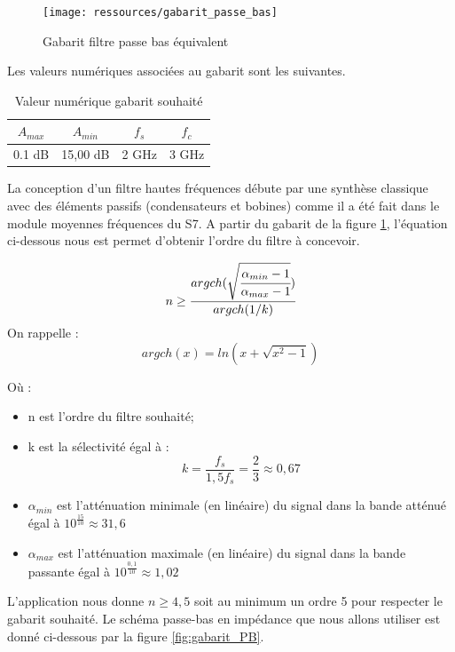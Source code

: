 \documentclass[french]{article}
\begin{document}
\begin{figure}[H]
	\centering
	\texttt{[image: ressources/gabarit\_passe\_bas]}
	\caption{Gabarit filtre passe bas équivalent}
	\label{fig:gabarit_PasseBas}
\end{figure}

Les valeurs numériques associées au gabarit sont les suivantes.
\begin{table}[H]
	\centering
	\begin{tabular}{|c|c|c|c|}
		\hline
		$A_{max}$& $A_{min}$ & $f_s$ & $f_c$ \\ \hline
		0.1	dB & 15,00 dB 		& 2 GHz	   & 3 GHz \\ \hline
	\end{tabular}
	\caption{Valeur numérique gabarit souhaité}
\end{table}
La conception d'un filtre hautes fréquences débute par une synthèse classique avec des éléments passifs (condensateurs et bobines) comme il a été fait dans le module moyennes fréquences du S7. A partir du gabarit de la figure \ref{fig:gabarit_PasseBas}, l'équation ci-dessous nous est permet d'obtenir l'ordre du filtre à concevoir.


\begin{equation}
	n \geq \cfrac{argch(\sqrt{\cfrac{\alpha_{min}-1}{\alpha_{max} -1}})}{argch(1/k)}
\end{equation}
On rappelle :
\begin{equation}
argch(x)=ln(x+\sqrt{x^2-1})
\end{equation}

Où :
\begin{itemize}
	\item n est l'ordre du filtre souhaité;
		\item k est la sélectivité égal à : 
	\begin{equation}
	k=\frac{f_s}{1,5f_s} = \frac{2}{3} \approx 0,67
	\end{equation}
	\item $\alpha_{min}$ est l'atténuation minimale (en linéaire) du signal dans la bande atténué égal à $10^{\frac{15}{10}} \approx 31,6$
	\item $\alpha_{max}$ est l'atténuation maximale (en linéaire) du signal dans la bande passante égal à $10^{\frac{0,1}{10}} \approx 1,02$
\end{itemize}

L'application nous donne $n \geq 4,5$ soit au minimum un ordre 5 pour respecter le gabarit souhaité. Le schéma passe-bas en impédance que nous allons utiliser est donné ci-dessous par la figure \ref{fig:gabarit_PB}.
\end{document}
